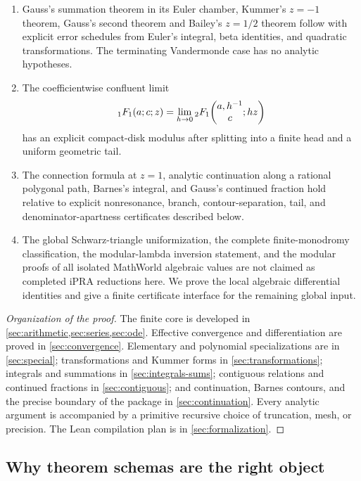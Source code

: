 \begin{theorem}
\begin{enumerate}[label=(\roman*)]
\item[\StatusB--3.] Gauss's summation theorem in its Euler chamber, Kummer's
\(z=-1\) theorem, Gauss's second theorem and Bailey's \(z=1/2\) theorem follow
with explicit error schedules from Euler's integral, beta identities, and
quadratic transformations.  The terminating Vandermonde case has no analytic
hypotheses.

\item[\StatusB--4.] The coefficientwise confluent limit
\[
 {}_1F_1(a;c;z)=\lim_{h\to0}{}_2F_1\!\left(\begin{matrix}a,h^{-1}\\c\end{matrix};hz\right)
\]
has an explicit compact-disk modulus after splitting into a finite head and a
uniform geometric tail.

\item[\StatusC--1.] The connection formula at \(z=1\), analytic continuation
along a rational polygonal path, Barnes's integral, and Gauss's continued
fraction hold relative to explicit nonresonance, branch, contour-separation,
tail, and denominator-apartness certificates described below.

\item[\StatusD--1.] The global Schwarz-triangle uniformization, the complete
finite-monodromy classification, the modular-lambda inversion statement, and
the modular proofs of all isolated MathWorld algebraic values are not claimed
as completed iPRA reductions here.  We prove the local algebraic differential
identities and give a finite certificate interface for the remaining global
input.
\end{enumerate}
\end{theorem}

\begin{proof}[Organization of the proof]
The finite core is developed in \cref{sec:arithmetic,sec:series,sec:ode}.
Effective convergence and differentiation are proved in
\cref{sec:convergence}.  Elementary and polynomial specializations are in
\cref{sec:special}; transformations and Kummer forms in
\cref{sec:transformations}; integrals and summations in
\cref{sec:integrals-sums}; contiguous relations and continued fractions in
\cref{sec:contiguous}; and continuation, Barnes contours, and the precise
boundary of the package in \cref{sec:continuation}.  Every analytic argument
is accompanied by a primitive recursive choice of truncation, mesh, or
precision.  The Lean compilation plan is in \cref{sec:formalization}.
\end{proof}

\subsection{Why theorem schemas are the right object}

